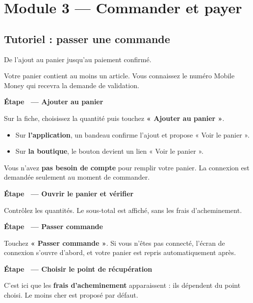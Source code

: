 \documentclass[11pt,a4paper]{report}
\newcounter{etape}[section]
\newcommand{\etape}[1]{%
  \stepcounter{etape}%
  \vspace{9pt}%
  \noindent{\color{garahPrimaire}\rule{3pt}{13pt}}\hspace{6pt}%
  {\bfseries\large Étape \theetape\ --- #1}\par\vspace{4pt}%
}
\begin{document}
\section{Module 3 — Commander et payer}

\subsection{Tutoriel : passer une commande}

\begin{objectif}
De l'ajout au panier jusqu'au paiement confirmé.
\end{objectif}

\begin{avant}
Votre panier contient au moins un article. Vous connaissez le numéro Mobile
Money qui recevra la demande de validation.
\end{avant}

\etape{Ajouter au panier}

Sur la fiche, choisissez la quantité puis touchez \textbf{« Ajouter au
panier »}.

\begin{itemize}[leftmargin=*,itemsep=2pt]
  \item Sur \textbf{l'application}, un bandeau confirme l'ajout et propose
        « Voir le panier ».
  \item Sur \textbf{la boutique}, le bouton devient un lien « Voir le panier ».
\end{itemize}

\begin{astuce}
Vous n'avez \textbf{pas besoin de compte} pour remplir votre panier. La
connexion est demandée seulement au moment de commander.
\end{astuce}

\etape{Ouvrir le panier et vérifier}

Contrôlez les quantités. Le sous-total est affiché, sans les frais
d'acheminement.

\etape{Passer commande}

Touchez \textbf{« Passer commande »}. Si vous n'êtes pas connecté, l'écran de
connexion s'ouvre d'abord, et votre panier est repris automatiquement après.

\etape{Choisir le point de récupération}

C'est ici que les \textbf{frais d'acheminement} apparaissent : ils dépendent du
point choisi. Le moins cher est proposé par défaut.
\end{document}
